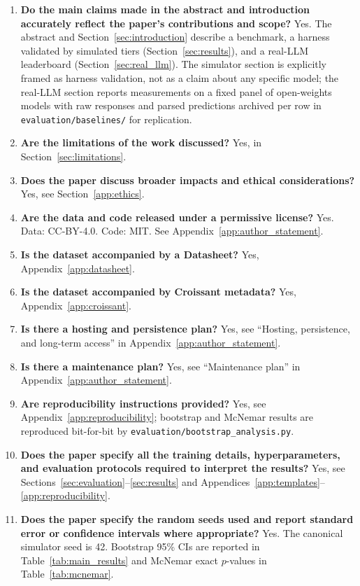 \documentclass{article}
\begin{document}
\begin{enumerate}[leftmargin=*,itemsep=2pt]
    \item \textbf{Do the main claims made in the abstract and introduction accurately reflect the paper's contributions and scope?} Yes. The abstract and Section~\ref{sec:introduction} describe a benchmark, a harness validated by simulated tiers (Section~\ref{sec:results}), and a real-LLM leaderboard (Section~\ref{sec:real_llm}). The simulator section is explicitly framed as harness validation, not as a claim about any specific model; the real-LLM section reports measurements on a fixed panel of open-weights models with raw responses and parsed predictions archived per row in \texttt{evaluation/baselines/} for replication.
    \item \textbf{Are the limitations of the work discussed?} Yes, in Section~\ref{sec:limitations}.
    \item \textbf{Does the paper discuss broader impacts and ethical considerations?} Yes, see Section~\ref{app:ethics}.
    \item \textbf{Are the data and code released under a permissive license?} Yes. Data: CC-BY-4.0. Code: MIT. See Appendix~\ref{app:author_statement}.
    \item \textbf{Is the dataset accompanied by a Datasheet?} Yes, Appendix~\ref{app:datasheet}.
    \item \textbf{Is the dataset accompanied by Croissant metadata?} Yes, Appendix~\ref{app:croissant}.
    \item \textbf{Is there a hosting and persistence plan?} Yes, see ``Hosting, persistence, and long-term access'' in Appendix~\ref{app:author_statement}.
    \item \textbf{Is there a maintenance plan?} Yes, see ``Maintenance plan'' in Appendix~\ref{app:author_statement}.
    \item \textbf{Are reproducibility instructions provided?} Yes, see Appendix~\ref{app:reproducibility}; bootstrap and McNemar results are reproduced bit-for-bit by \texttt{evaluation/bootstrap\_analysis.py}.
    \item \textbf{Does the paper specify all the training details, hyperparameters, and evaluation protocols required to interpret the results?} Yes, see Sections~\ref{sec:evaluation}--\ref{sec:results} and Appendices~\ref{app:templates}--\ref{app:reproducibility}.
    \item \textbf{Does the paper specify the random seeds used and report standard error or confidence intervals where appropriate?} Yes. The canonical simulator seed is 42. Bootstrap 95\% CIs are reported in Table~\ref{tab:main_results} and McNemar exact $p$-values in Table~\ref{tab:mcnemar}.

\end{enumerate}
\end{document}
